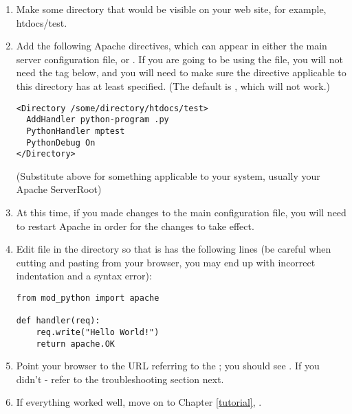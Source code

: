 \begin{enumerate}

\item
Make some directory that would be visible on your web site, for
example, htdocs/test.

\item
Add the following Apache directives, which can appear in either the
main server configuration file, or .  If you are going
to be using the  file, you will not need the
 tag below, and you will need to make sure the
 directive applicable to this directory has at least
 specified. (The default is , which will not work.)

\begin{verbatim}
<Directory /some/directory/htdocs/test> 
  AddHandler python-program .py
  PythonHandler mptest 
  PythonDebug On 
</Directory>
\end{verbatim}

(Substitute  above for something applicable to
your system, usually your Apache ServerRoot)

\item
At this time, if you made changes to the main configuration file, you
will need to restart Apache in order for the changes to take effect.

\item
Edit  file in the  directory so
that is has the following lines (be careful when cutting and pasting
from your browser, you may end up with incorrect indentation and a
syntax error):

\begin{verbatim}
from mod_python import apache

def handler(req):
    req.write("Hello World!")
    return apache.OK 
\end{verbatim}

\item
Point your browser to the URL referring to the ; you
should see . If you didn't - refer to the
troubleshooting section next.

\item
If everything worked well, move on to Chapter \ref{tutorial}, 
. 

\end{enumerate}

